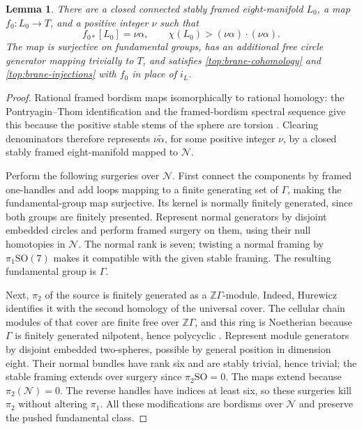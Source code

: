 \documentclass[11pt]{article}
\newtheorem{lemma}[theorem]{Lemma}
\theoremstyle{definition}
\theoremstyle{remark}
\numberwithin{equation}{section}
\begin{document}
\begin{lemma}\label{top:framed-source}
There are a closed connected stably framed eight-manifold $L_0$, a map
$f_0:L_0\to T$, and a positive integer $\nu$ such that
\[
 f_{0*}[L_0]=\nu\alpha,\qquad
 \chi(L_0)>(\nu\alpha)\cdot(\nu\alpha).
\]
The map is surjective on fundamental groups, has an additional free
circle generator mapping trivially to $T$, and satisfies
\eqref{top:brane-cohomology} and \eqref{top:brane-injections} with
$f_0$ in place of $i_L$.
\end{lemma}

\begin{proof}
Rational framed bordism maps isomorphically to rational homology: the
Pontryagin--Thom identification and the framed-bordism spectral sequence
give this because the positive stable stems of the sphere are torsion
\cite[proof of Proposition~3.1]{framed-rational}.  Clearing denominators
therefore represents $\nu\widetilde\alpha$, for some positive integer
$\nu$, by a closed stably framed eight-manifold mapped to $\mathcal N$.

Perform the following surgeries over $\mathcal N$.  First connect the
components by framed one-handles and add loops mapping to a finite
generating set of $\Gamma$, making the fundamental-group map
surjective.  Its kernel is normally finitely generated, since both
groups are finitely presented.  Represent normal generators by disjoint
embedded circles and perform framed surgery on them, using their null
homotopies in $\mathcal N$.  The normal rank is seven; twisting a
normal framing by $\pi_1\mathrm{SO}(7)$ makes it compatible with the
given stable framing.  The resulting fundamental group is $\Gamma$.

Next, $\pi_2$ of the source is finitely generated as a
$\mathbb Z\Gamma$-module.  Indeed, Hurewicz identifies it with the second
homology of the universal cover.  The cellular chain modules of that
cover are finite free over $\mathbb Z\Gamma$, and this ring is Noetherian
because $\Gamma$ is finitely generated nilpotent, hence polycyclic
\cite{hall}.  Represent module generators by disjoint embedded
two-spheres, possible by general position in dimension eight.  Their
normal bundles have rank six and are stably trivial, hence trivial;
the stable framing extends over surgery since $\pi_2\mathrm{SO}=0$.
The maps extend because $\pi_2(\mathcal N)=0$.  The reverse handles
have indices at least six, so these surgeries kill $\pi_2$ without
altering $\pi_1$.  All these modifications are bordisms over
$\mathcal N$ and preserve the pushed fundamental class.


\end{proof}
\end{document}
